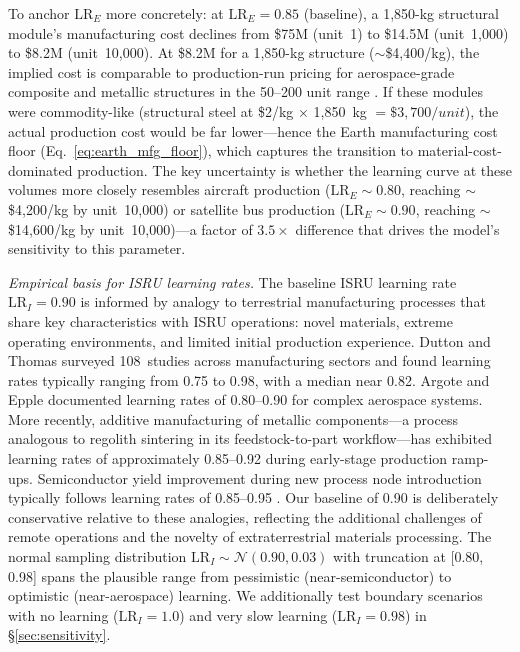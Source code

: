 \documentclass[preprint,12pt]{elsarticle}
\begin{document}
To anchor $\mathrm{LR}_E$ more concretely: at $\mathrm{LR}_E = 0.85$ (baseline), a 1,850-kg structural module's manufacturing cost declines from \$75M (unit~1) to \$14.5M (unit~1,000) to \$8.2M (unit~10,000). At \$8.2M for a 1,850-kg structure ($\sim$\$4,400/kg), the implied cost is comparable to production-run pricing for aerospace-grade composite and metallic structures in the 50--200 unit range \cite{wertz2011}. If these modules were commodity-like (structural steel at \$2/kg $\times$ 1,850~kg $= \$3,700/unit$), the actual production cost would be far lower---hence the Earth manufacturing cost floor (Eq.~\ref{eq:earth_mfg_floor}), which captures the transition to material-cost-dominated production. The key uncertainty is whether the learning curve at these volumes more closely resembles aircraft production ($\mathrm{LR}_E \sim 0.80$, reaching $\sim$\$4,200/kg by unit~10,000) or satellite bus production ($\mathrm{LR}_E \sim 0.90$, reaching $\sim$\$14,600/kg by unit~10,000)---a factor of $3.5\times$ difference that drives the model's sensitivity to this parameter.

\emph{Empirical basis for ISRU learning rates.} The baseline ISRU learning rate $\mathrm{LR}_I = 0.90$ is informed by analogy to terrestrial manufacturing processes that share key characteristics with ISRU operations: novel materials, extreme operating environments, and limited initial production experience. Dutton and Thomas \cite{dutton1984} surveyed 108~studies across manufacturing sectors and found learning rates typically ranging from 0.75 to 0.98, with a median near 0.82. Argote and Epple \cite{argote1990} documented learning rates of 0.80--0.90 for complex aerospace systems. More recently, additive manufacturing of metallic components---a process analogous to regolith sintering in its feedstock-to-part workflow---has exhibited learning rates of approximately 0.85--0.92 during early-stage production ramp-ups. Semiconductor yield improvement during new process node introduction typically follows learning rates of 0.85--0.95 \cite{nagy2013}. Our baseline of 0.90 is deliberately conservative relative to these analogies, reflecting the additional challenges of remote operations and the novelty of extraterrestrial materials processing. The normal sampling distribution $\mathrm{LR}_I \sim \mathcal{N}(0.90, 0.03)$ with truncation at [0.80, 0.98] spans the plausible range from pessimistic (near-semiconductor) to optimistic (near-aerospace) learning. We additionally test boundary scenarios with no learning ($\mathrm{LR}_I = 1.0$) and very slow learning ($\mathrm{LR}_I = 0.98$) in \S\ref{sec:sensitivity}.
\end{document}
